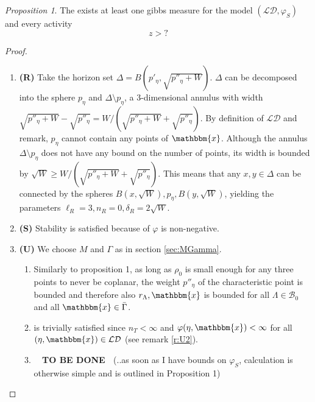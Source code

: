 \documentclass[12pt,a4paper]{article}
\theoremstyle{definition}
\theoremstyle{remark}
\theoremstyle{theorem}
\newtheorem{proposition}{Proposition}
\newcommand{\tbd}{\textbf{{\color{red}~ TO BE DONE ~}}}
\newcommand{\x}{\mathbbm{x}}
\begin{document}
\begin{proposition}
	The exists at least one gibbs measure for the model $(\mathcal {LD},\varphi_S)$ and every activity
	$$z > ?$$
\end{proposition}
\begin{proof}
\begin{enumerate}[]
	\item \textbf{(R)} Take the horizon set $\Delta = B(p'_\eta, \sqrt{p''_\eta + W})$. $\Delta$ can be decomposed into the sphere $p_\eta$ and $\Delta \setminus p_\eta$, a 3-dimensional annulus with width $\sqrt{p''_\eta+W} -\sqrt{p''_\eta}=W/(\sqrt{p''_\eta+W} + \sqrt{p''_\eta})$. By definition of $\mathcal {LD}$ and remark, $p_\eta$  cannot contain any points of $\x$.  Although the annulus $\Delta \setminus p_\eta$ does not have any bound on the number of points, its width is bounded by $\sqrt W \geq  W/(\sqrt{p''_\eta+W} + \sqrt{p''_\eta})$. This means that any $x,y\in \Delta$ can be connected by the spheres $B(x,\sqrt W), p_\eta, B(y,\sqrt W)$, yielding the parameters $\ell_R = 3,n_R=0,\delta_R=2\sqrt W$.
	\item \textbf{(S)} Stability is satisfied because of $\varphi$ is non-negative.
	\item \textbf{(U)} We choose $M$ and $\Gamma$ as in section \ref{sec:MGamma}.
		\begin{enumerate}[(U1)]
			\item {} Similarly to proposition 1, as long as $\rho_0$ is small enough for any three points to never be coplanar, the weight $p''_\eta$ of the characteristic point is bounded and therefore also $r_\Lambda,\x$ is bounded for all $\Lambda \in \mathcal B_0$ and all $\x \in \bar \Gamma$.
			\item is trivially satisfied since $n_T < \infty$ and $\varphi(\eta,\x)<\infty$ for all $(\eta,\x)\in\mathcal {LD}$ (see remark \ref{r:U2}). 
			\item \tbd (..as soon as I have bounds on $\varphi_S$, calculation is otherwise simple and is outlined in Proposition 1)
		\end{enumerate}
\end{enumerate}
\end{proof}
\end{document}
